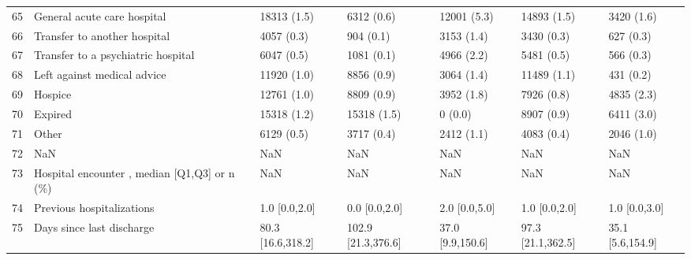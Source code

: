\begin{tabular}{lllllll}
65 &                        General acute care hospital &        18313 (1.5) &                    6312 (0.6) &               12001 (5.3) &                    14893 (1.5) &                3420 (1.6) \\
66 &                       Transfer to another hospital &         4057 (0.3) &                     904 (0.1) &                3153 (1.4) &                     3430 (0.3) &                 627 (0.3) \\
67 &                 Transfer to a psychiatric hospital &         6047 (0.5) &                    1081 (0.1) &                4966 (2.2) &                     5481 (0.5) &                 566 (0.3) \\
68 &                        Left against medical advice &        11920 (1.0) &                    8856 (0.9) &                3064 (1.4) &                    11489 (1.1) &                 431 (0.2) \\
69 &                                            Hospice &        12761 (1.0) &                    8809 (0.9) &                3952 (1.8) &                     7926 (0.8) &                4835 (2.3) \\
70 &                                            Expired &        15318 (1.2) &                   15318 (1.5) &                   0 (0.0) &                     8907 (0.9) &                6411 (3.0) \\
71 &                                              Other &         6129 (0.5) &                    3717 (0.4) &                2412 (1.1) &                     4083 (0.4) &                2046 (1.0) \\
72 &                                                NaN &                NaN &                           NaN &                       NaN &                            NaN &                       NaN \\
73 &       Hospital encounter , median [Q1,Q3] or n (\%) &                NaN &                           NaN &                       NaN &                            NaN &                       NaN \\
74 &                          Previous hospitalizations &      1.0 [0.0,2.0] &                 0.0 [0.0,2.0] &             2.0 [0.0,5.0] &                  1.0 [0.0,2.0] &             1.0 [0.0,3.0] \\
75 &                          Days since last discharge &  80.3 [16.6,318.2] &            102.9 [21.3,376.6] &          37.0 [9.9,150.6] &              97.3 [21.1,362.5] &          35.1 [5.6,154.9] \\

\end{tabular}
